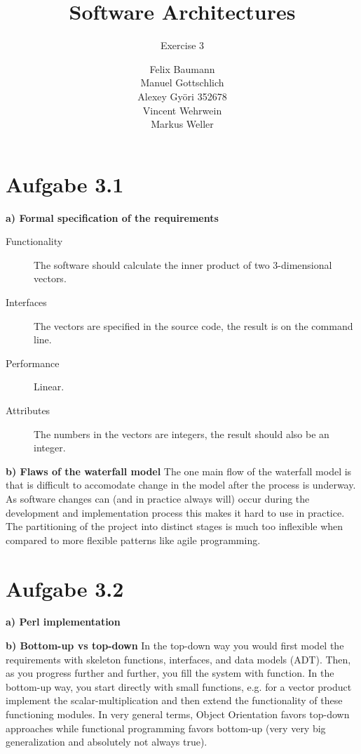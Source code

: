 \documentclass[a4paper,10pt]{scrartcl}[2003/01/01]
\title{Software Architectures}
\subtitle{Exercise 3}
\author{ Felix Baumann \\ Manuel Gottschlich \\  Alexey Gy\"ori 352678 \\ Vincent Wehrwein \\ Markus Weller}
\begin{document}
    \maketitle
    
    \section*{Aufgabe 3.1}
    \textbf{a) Formal specification of the requirements}
    \begin{description}
      \item[Functionality] The software should calculate the inner product of two 3-dimensional vectors.
      \item[Interfaces] The vectors are specified in the source code, the result is on the command line.
      \item[Performance] Linear.
      \item[Attributes] The numbers in the vectors are integers, the result should also be an integer. 
    \end{description}
    
    \textbf{b) Flaws of the waterfall model}
    The one main flow of the waterfall model is that is difficult to accomodate change in the model after the process is underway. As software changes can (and in practice always will) occur during the development and implementation process this makes it hard to use in practice. The partitioning of the project into distinct stages is much too inflexible when compared to more flexible patterns like agile programming.
    \newpage
    \section*{Aufgabe 3.2}
    \textbf{a) Perl implementation}
    
    \textbf{b) Bottom-up vs top-down}
    In the top-down way you would first model the requirements with skeleton functions, interfaces, and data models (ADT). Then, as you progress further and further, you fill the system with function. In the bottom-up way, you start directly with small functions, e.g. for a vector product implement the scalar-multiplication and then extend the functionality of these functioning modules. In very general terms, Object Orientation favors top-down approaches while functional programming favors bottom-up (very very big generalization and absolutely not always true).
\end{document}
